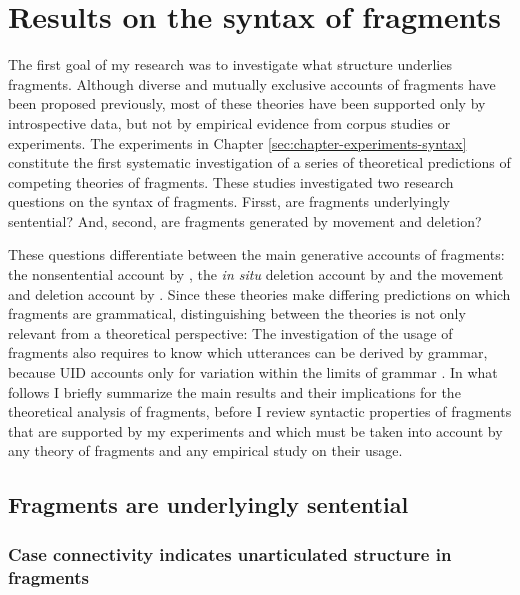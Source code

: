 \section{Results on the syntax of fragments}
The first goal of my research was to investigate what structure underlies fragments. Although diverse and mutually exclusive accounts of fragments have been proposed previously, most of these theories have been supported only by introspective data, but not by empirical evidence from corpus studies or experiments. The experiments in Chapter \ref{sec:chapter-experiments-syntax} constitute the first systematic investigation of a series of theoretical predictions of competing theories of fragments. These studies investigated two research questions on the syntax of fragments. Firsst, are fragments underlyingly sentential? And, second, are fragments generated by movement and deletion?

These questions differentiate between the main generative accounts of fragments: the nonsentential account by \citet{barton.progovac2005}, the \textit{in situ} deletion account by \citet{reich2007} and the movement and deletion account by \citet{merchant2004}. Since these theories make differing predictions on which fragments are grammatical, distinguishing between the theories is not only relevant from a theoretical perspective: The investigation of the usage of fragments also requires to know which utterances can be derived by grammar, because UID accounts only for variation within the limits of grammar \citep{jaeger2010}. In what follows I briefly summarize the main results and their implications for the theoretical analysis of fragments, before I review syntactic properties of fragments that are supported by my experiments and which must be taken into account by any theory of fragments and any empirical study on their usage.

\subsection{Fragments are underlyingly sentential}
\subsubsection{Case connectivity indicates unarticulated structure in fragments}

